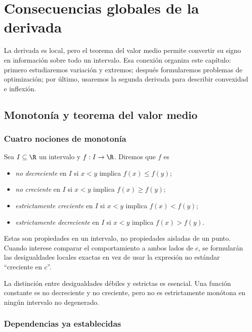 \chapter{Consecuencias globales de la derivada}
\label{chap:consecuencias-derivada}

La derivada es local, pero el teorema del valor medio permite convertir su
signo en información sobre todo un intervalo. Esa conexión organiza este
capítulo: primero estudiaremos variación y extremos; después formularemos
problemas de optimización; por último, usaremos la segunda derivada para
describir convexidad e inflexión.

\section{Monotonía y teorema del valor medio}
\label{sec:monotonia-mvt}

\subsection{Cuatro nociones de monotonía}

Sea \(I\subseteq\R\) un intervalo y \(f:I\to\R\). Diremos que \(f\) es

\begin{itemize}
  \item \emph{no decreciente} en \(I\) si
        \(x<y\) implica \(f(x)\le f(y)\);
  \item \emph{no creciente} en \(I\) si
        \(x<y\) implica \(f(x)\ge f(y)\);
  \item \emph{estrictamente creciente} en \(I\) si
        \(x<y\) implica \(f(x)<f(y)\);
  \item \emph{estrictamente decreciente} en \(I\) si
        \(x<y\) implica \(f(x)>f(y)\).
\end{itemize}

Estas son propiedades en un intervalo, no propiedades aisladas de un punto.
Cuando interese comparar el comportamiento a ambos lados de \(c\), se
formularán las desigualdades locales exactas en vez de usar la expresión no
estándar ``creciente en \(c\)''.

La distinción entre desigualdades débiles y estrictas es esencial. Una función
constante es no decreciente y no creciente, pero no es estrictamente monótona
en ningún intervalo no degenerado.

\subsection{Dependencias ya establecidas}

